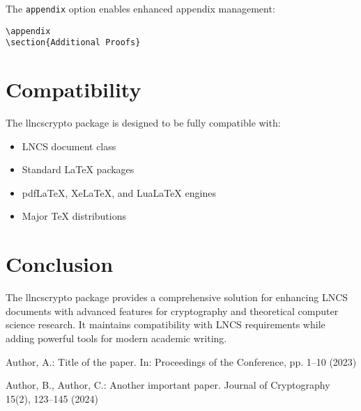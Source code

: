 \documentclass{llncs}
\begin{document}
The \texttt{appendix} option enables enhanced appendix management:

\begin{verbatim}
\appendix
\section{Additional Proofs}
\end{verbatim}

\section{Compatibility}

The \textsf{llncscrypto} package is designed to be fully compatible with:
\begin{itemize}
    \item LNCS document class
    \item Standard LaTeX packages
    \item pdfLaTeX, XeLaTeX, and LuaLaTeX engines
    \item Major TeX distributions
\end{itemize}

\section{Conclusion}

The \textsf{llncscrypto} package provides a comprehensive solution for
enhancing LNCS documents with advanced features for cryptography and
theoretical computer science research. It maintains compatibility with LNCS
requirements while adding powerful tools for modern academic writing.


\begin{thebibliography}{8}

    Author, A.: Title of the paper. In: Proceedings of the Conference, pp. 1--10 (2023)

    Author, B., Author, C.: Another important paper. Journal of Cryptography 15(2), 123--145 (2024)

\end{thebibliography}
\end{document}
